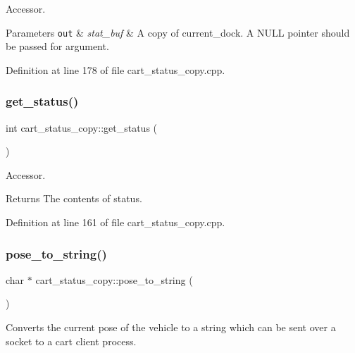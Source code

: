 Accessor. 
\begin{DoxyParams}[1]{Parameters}
\mbox{\tt out}  & {\em stat\+\_\+buf} & A copy of current\+\_\+dock. A N\+U\+LL pointer should be passed for argument. \\
\hline
\end{DoxyParams}


Definition at line 178 of file cart\+\_\+status\+\_\+copy.\+cpp.

\mbox{\label{classcart__status__copy_a482b6c7e3bcd3102028c59dacb70ad00}} 
\subsubsection{\texorpdfstring{get\+\_\+status()}{get\_status()}}
{\footnotesize\ttfamily int cart\+\_\+status\+\_\+copy\+::get\+\_\+status (\begin{DoxyParamCaption}{ }\end{DoxyParamCaption})}

Accessor. \begin{DoxyReturn}{Returns}
The contents of status. 
\end{DoxyReturn}


Definition at line 161 of file cart\+\_\+status\+\_\+copy.\+cpp.

\mbox{\label{classcart__status__copy_a1b4788c35bb97d5447b0a7260a85c40d}} 
\subsubsection{\texorpdfstring{pose\+\_\+to\+\_\+string()}{pose\_to\_string()}}
{\footnotesize\ttfamily char $\ast$ cart\+\_\+status\+\_\+copy\+::pose\+\_\+to\+\_\+string (\begin{DoxyParamCaption}{ }\end{DoxyParamCaption})}

Converts the current pose of the vehicle to a string which can be sent over a socket to a cart client process. 


